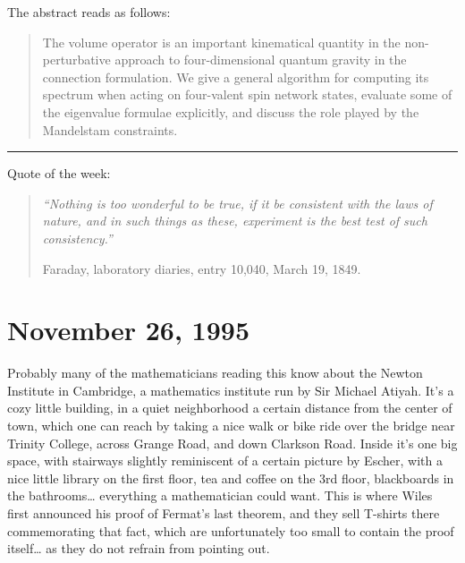\documentclass{article}
\def\tightlist{}
\renewcommand{\texttt}[1]{%
  \begingroup
  \ttfamily
  \begingroup\lccode`~=`/\lowercase{\endgroup\def~}{/\discretionary{}{}{}}%
  \begingroup\lccode`~=`[\lowercase{\endgroup\def~}{[\discretionary{}{}{}}%
  \begingroup\lccode`~=`.\lowercase{\endgroup\def~}{.\discretionary{}{}{}}%
  \catcode`/=\active\catcode`[=\active\catcode`.=\active
  \scantokens{#1\noexpand}%
  \endgroup
}
\begin{document}

The abstract reads as follows:

\begin{quote}
The volume operator is an important kinematical quantity in the
non-perturbative approach to four-dimensional quantum gravity in the
connection formulation. We give a general algorithm for computing its
spectrum when acting on four-valent spin network states, evaluate some
of the eigenvalue formulae explicitly, and discuss the role played by
the Mandelstam constraints.
\end{quote}

\begin{center}\rule{0.5\linewidth}{0.5pt}\end{center}

Quote of the week:

\begin{quote}
\emph{``Nothing is too wonderful to be true, if it be consistent with
the laws of nature, and in such things as these, experiment is the best
test of such consistency.''}

Faraday, laboratory diaries, entry 10,040, March 19, 1849.
\end{quote}



\hypertarget{week70}{%
\section{November 26, 1995}\label{week70}}

Probably many of the mathematicians reading this know about the Newton
Institute in Cambridge, a mathematics institute run by Sir Michael
Atiyah. It's a cozy little building, in a quiet neighborhood a certain
distance from the center of town, which one can reach by taking a nice
walk or bike ride over the bridge near Trinity College, across Grange
Road, and down Clarkson Road. Inside it's one big space, with stairways
slightly reminiscent of a certain picture by Escher, with a nice little
library on the first floor, tea and coffee on the 3rd floor, blackboards
in the bathrooms\ldots{} everything a mathematician could want. This is
where Wiles first announced his proof of Fermat's last theorem, and they
sell T-shirts there commemorating that fact, which are unfortunately too
small to contain the proof itself\ldots{} as they do not refrain from
pointing out.
\end{document}
